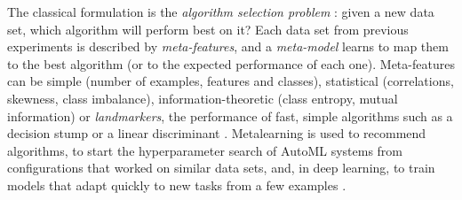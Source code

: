 The classical formulation is the \emph{algorithm selection problem} \citep{rice1976algorithm}: given a
new data set, which algorithm will perform best on it? Each data set from previous experiments is
described by \emph{meta-features}, and a \emph{meta-model} learns to map them to the best algorithm (or
to the expected performance of each one). Meta-features can be simple (number of examples, features
and classes), statistical (correlations, skewness, class imbalance), information-theoretic (class
entropy, mutual information) or \emph{landmarkers}, the performance of fast, simple algorithms such as
a decision stump or a linear discriminant \citep{pfahringer2000meta}. Metalearning is used to recommend
algorithms, to start the hyperparameter search of AutoML systems from configurations that worked on
similar data sets, and, in deep learning, to train models that adapt quickly to new tasks from a few
examples \citep{finn2017model}.

